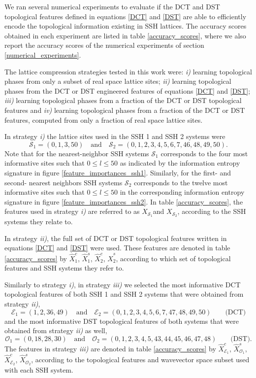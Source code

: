 \documentclass[10pt]{revtex4-1}
\newcommand\sitesSOne{(0, 1, 3, 50)}
\newcommand\sitesEOne{(1, 2, 36, 49)}
\newcommand\sitesOOne{(0, 18, 28, 30)}
\newcommand\sitesSTwo{(0, 1, 2, 3, 4, 5, 6, 7, 46, 48, 49, 50)}
\newcommand\sitesETwo{(0, 1, 2, 3, 4, 5, 6, 7, 47, 48, 49, 50)}
\newcommand\sitesOTwo{(0, 1, 2, 3, 4, 5, 43, 44, 45, 46, 47, 48)}
\newcommand\xSOne{$X_{\mathcal{S}_1}$}
\newcommand\xcOne{$\hat{X}^c_1$}
\newcommand\xcEOne{$\hat{X}^c_{\mathcal{E}_1}$}
\newcommand\xsOne{$\hat{X}^s_1$}
\newcommand\xsOOne{$\hat{X}^s_{\mathcal{O}_1}$}
\newcommand\xSTwo{$X_{\mathcal{S}_2}$}
\newcommand\xcTwo{$\hat{X}^c_2$}
\newcommand\xcETwo{$\hat{X}^c_{\mathcal{E}_2}$}
\newcommand\xsTwo{$\hat{X}^s_2$}
\newcommand\xsOTwo{$\hat{X}^s_{\mathcal{O}_2}$}
\begin{document}
We ran several numerical experiments to evaluate if the DCT and DST topological features defined in equations \eqref{DCT} and \eqref{DST}  are able to efficiently encode the topological information existing in SSH lattices. The accuracy scores obtained in each experiment are listed in table \ref{accuracy_scores}, where we also report the accuracy scores of the numerical experiments of section \ref{numerical_experiments}.

The lattice compression strategies tested in this work were: \emph{i)} learning topological phases from only a subset of real space lattice sites; \emph{ii)} learning topological phases from the DCT or DST engineered features of equations \eqref{DCT} and \eqref{DST}; \emph{iii)} learning topological phases from a fraction of the DCT or DST topological features and \emph{iv)} learning topological phases from a fraction of the DCT or DST features, computed from only a fraction of real space lattice sites. 

In strategy \emph{i)} the lattice sites used in the SSH 1 and SSH 2 systems were
\begin{equation}
\label{lattice_subsets}
\mathcal{S}_1 = \sitesSOne \quad \text{and} \quad  \mathcal{S}_2 =\sitesSTwo.   
\end{equation}
Note that for the nearest-neighbor SSH systems $\mathcal{S}_1$ corresponds to the four most informative sites such that $0\leq l \leq 50$ as indicated by the information entropy signature in figure \ref{feature_importances_ssh1}. Similarly, for the first- and second- nearest neighbors SSH systems $\mathcal{S}_2$ corresponds to the twelve most informative sites such that $0\leq l \leq 50$ in the corresponding information entropy signature in figure \ref{feature_importances_ssh2}. In table \ref{accuracy_scores}, the features used in strategy \emph{i)} are referred to as \xSOne and \xSTwo, according to the SSH systems they relate to.  

In strategy \emph{ii)}, the full set of DCT or DST topological features written in equations \eqref{DCT} and \eqref{DST} were used. These features are denoted in table \ref{accuracy_scores} by \xcOne, \xsOne, \xcTwo, \xsTwo, according to which set of topological features and SSH systems they refer to. 

Similarly to strategy \emph{i)}, in strategy \emph{iii)} we selected the most informative DCT topological features of both SSH 1 and SSH 2 systems that were obtained from strategy \emph{ii)},
\begin{equation}
\label{DCT_subsets}
\mathcal{E}_1 = \sitesEOne \quad \text{and} \quad  \mathcal{E}_2 =\sitesETwo \qquad \text{(DCT)}  
\end{equation}
and the most informative DST topological features of both systems that were obtained from strategy \emph{ii)} as well,
\begin{equation}
\label{DST_subsets}
\mathcal{O}_1 =  \sitesOOne \quad \text{and} \quad  \mathcal{O}_2 = \sitesOTwo \qquad \text{(DST)}.  
\end{equation}
The features in strategy \emph{iii)} are denoted in table \ref{accuracy_scores} by \xcEOne, \xsOOne, \xcETwo, \xsOTwo,   according to the topological features and wavevector space subset used with each SSH system. 
\end{document}
